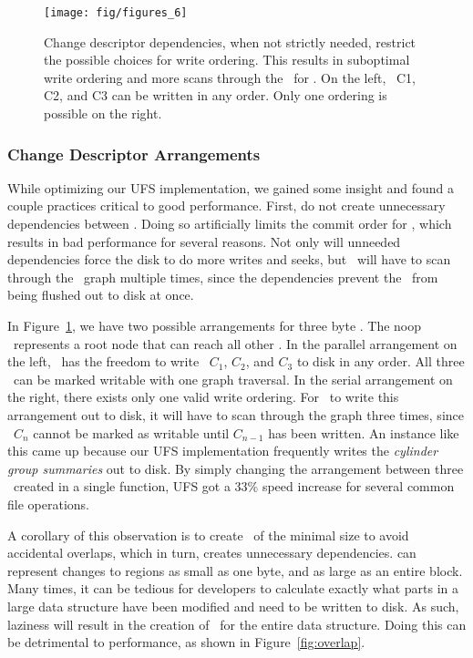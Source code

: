 \begin{figure}[htb]
  \centering
  \texttt{[image: fig/figures\_6]}
  \caption{\label{fig:chdescarrange} Change descriptor dependencies, when
  not strictly needed, restrict the possible choices for write ordering.
  This results in suboptimal write ordering and more scans through the
  \chdescs\ for \Kudos. On the left, \chdescs\ C1, C2, and C3 can be written
  in any order. Only one ordering is possible on the right.}
\end{figure}

\subsubsection {Change Descriptor Arrangements}
While optimizing our UFS implementation, we gained some insight and found a
couple practices critical to good performance. First, do not create unnecessary
dependencies between \chdescs. Doing so artificially limits the commit order
for \chdescs, which results in bad performance for several reasons. Not only
will unneeded dependencies force the disk to do more writes and seeks, but
\Kudos\ will have to scan through the \chdesc\ graph multiple times, since the
dependencies prevent the \chdescs\ from being flushed out to disk at once.

In Figure~\ref{fig:chdescarrange}, we have two possible arrangements for three
byte \chdescs. The noop \chdesc\ represents a root node that can reach all
other \chdescs. In the parallel arrangement on the left, \Kudos\ has the
freedom to write \chdescs\ $C_1$, $C_2$, and $C_3$ to disk in any order. All
three \chdescs\ can be marked writable with one graph traversal. In the serial
arrangement on the right, there exists only one valid write ordering. For
\Kudos\ to write this arrangement out to disk, it will have to scan through
the graph three times, since \chdesc\ $C_n$ cannot be marked as writable until
$C_{n-1}$ has been written.
An instance like this came up because our UFS implementation frequently writes
the \emph{cylinder group summaries} out to disk. By simply changing the
arrangement between three \chdescs\ created in a single function, UFS got a
33\% speed increase for several common file operations.

A corollary of this observation is to create \chdescs\ of the minimal size to
avoid accidental overlaps, which in turn, creates unnecessary dependencies.
\Chdescs can represent changes to regions as small as one byte, and as large
as an entire block. Many times, it can be tedious for developers to calculate
exactly what parts in a large data structure have been modified and need to be
written to disk. As such, laziness will result in the creation of \chdescs\
for the entire data structure. Doing this can be detrimental to performance,
as shown in Figure~\ref{fig:overlap}.

